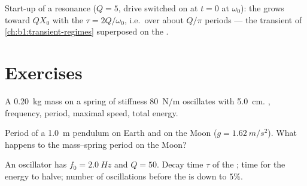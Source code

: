 \begin{omfigure}

{\small Start-up of a resonance ($Q = 5$, drive switched on at $t = 0$
at $\omega_0$): the  grows toward $QX_0$ with the 
$\tau = 2Q/\omega_0$, i.e.\ over about $Q/\pi$ periods --- the transient
of \cref{ch:b1:transient-regimes} superposed on the .}
\end{omfigure}

\section{Exercises}

\begin{exercise}[$\star$]\label{exo:b1:oscillators-resonance:1}
A \qty{0.20}{kg} mass on a spring of stiffness \qty{80}{N/m} oscillates
with  \qty{5.0}{cm}. , frequency, period,
maximal speed, total energy.
\end{exercise}

\begin{exercise}[$\star$]\label{exo:b1:oscillators-resonance:2}
Period of a \qty{1.0}{m} pendulum on Earth and on the Moon
($g = \qty{1.62}{m/s^2}$). What happens to the mass--spring period on the
Moon?
\end{exercise}

\begin{exercise}[$\star$]\label{exo:b1:oscillators-resonance:3}
An oscillator has $f_0 = \qty{2.0}{Hz}$ and $Q = 50$. Decay time $\tau$
of the ; time for the energy to halve; number of oscillations
before the  is down to $5\%$.
\end{exercise}


